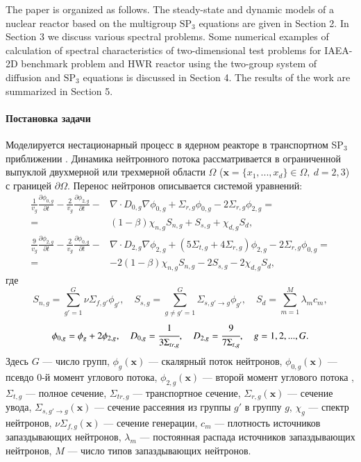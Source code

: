 \documentclass{crm-article}
\begin{document}
The paper is organized as follows. 
The steady-state and dynamic models of a nuclear reactor based on the multigroup $\mathrm{SP_3}$ equations are given in Section 2. 
In Section 3 we discuss various spectral problems. 
Some numerical examples of calculation of spectral characteristics of two-dimensional test problems for IAEA-2D benchmark problem and HWR reactor using the two-group system of diffusion and $\mathrm{SP_3}$ equations is discussed in Section 4. 
The results of the work are summarized in Section 5.

\paragraph{Постановка задачи}
Моделируется нестационарный процесс в ядерном реакторе в транспортном SP$_3$ приближении \cite{brantley2000}. Динамика нейтронного потока рассматривается в ограниченной выпуклой двухмерной или трехмерной области  $\Omega$ ($\bm x = \{x_1, ..., x_d\} \in \Omega, \ d = 2,3$) с границей $\partial \Omega$. 
Перенос нейтронов описывается системой уравнений:
\begin{equation}\label{1}
\begin{split}
 \frac{1}{v_g} \frac{\partial \phi_{0,g}}{\partial t} - \frac{2}{v_g} \frac{\partial \phi_{2,g}}{\partial t} - & \nabla \cdot D_{0,g} \nabla \phi_{0,g} + \Sigma_{r,g} \phi_{0,g} -  2\Sigma_{r,g} \phi_{2,g} = \\ 
 =  & (1-\beta)\chi_{n,g} S_{n,g} + S_{s,g} + \chi_{d,g} S_d, \\
 \frac{9}{v_g} \frac{\partial \phi_{2,g}}{\partial t} - \frac{2}{v_g} \frac{\partial \phi_{0,g}}{\partial t} - & \nabla \cdot D_{2,g} \nabla \phi_{2,g} + (5\Sigma_{t,g} + 4\Sigma_{r,g}) \phi_{2,g} -  2\Sigma_{r,g} \phi_{0,g} = \\ 
 =  & -2(1-\beta)\chi_{n,g} S_{n,g} - 2S_{s,g} - 2\chi_{d,g} S_d,
\end{split}
\end{equation}
где
\[
S_{n,g} =  \sum_{g'=1}^{G} \nu \Sigma_{f,g'} \phi_{g'}, 
\quad
S_{s,g} = \sum_{g\neq g'=1}^{G} \Sigma_{s,g'\rightarrow g} \phi_{g'},
\quad
S_{d} = \sum_{m=1}^{M} \lambda_m c_m,
\]
\[
\phi_{0,g}=\phi_g + 2\phi_{2,g}, 
\quad
D_{0,g} = \cfrac{1}{3\Sigma_{tr,g}}, 
\quad
D_{2,g} = \cfrac{9}{7\Sigma_{t,g}}, 
\quad g=1,2,...,G.
\]
Здесь $G$ --- число групп,
$\phi_g(\bm x)$ --- скалярный поток нейтронов,
$\phi_{0,g}(\bm x)$ --- псевдо 0-й момент углового потока,
$\phi_{2,g}(\bm x)$ --- второй момент углового потока ,
$\Sigma_{t,g}$ --- полное сечение, 
$\Sigma_{tr,g}$ --- транспортное сечение, 
 $\Sigma_{r,g}(\bm x)$ --- сечение увода,
$\Sigma_{s,g'\rightarrow g}(\bm x)$ --- сечение рассеяния из группы $g'$ в группу $g$,
$\chi_g$  --- спектр нейтронов, 
$\nu\Sigma_{f,g}(\bm x)$ --- сечение генерации,
$c_m$ --- плотность источников запаздывающих нейтронов,
$\lambda_m$ --- постоянная распада источников запаздывающих нейтронов,
$M$ --- число типов запаздывающих нейтронов.
\end{document}
